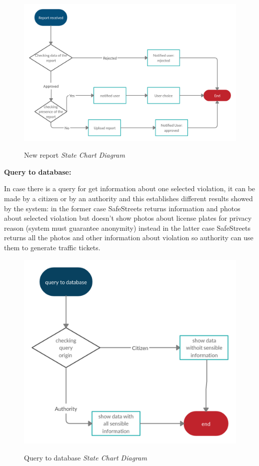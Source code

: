 \documentclass[../RASD.tex]{subfiles}
\begin{document}
    \begin{figure}[H]
        \centering
        \includegraphics[scale = 0.3]{assets/newReportV2.png}\\[1.6 cm]
        \caption[ New report \textit{State Chart Diagram}]{ New report \textit{State Chart Diagram}}
    \end{figure}

    \textbf{Query to database:}

    In case there is a query for get information about one selected violation, it can be made by a citizen or by an authority and this establishes
    different results showed by the system: in the former case SafeStreets returns information and photos about selected violation
    but doesn’t show photos about license plates for privacy reason (system must guarantee anonymity) instead in the latter case
    SafeStreets returns all the photos and other information about violation so authority can use them to generate traffic tickets.

    \begin{figure}[H]
        \centering
        \includegraphics[scale = 0.3]{assets/queryDbV1.png}\\[1.6 cm]
        \caption[ Query to database \textit{State Chart Diagram}]{ Query to database \textit{State Chart Diagram}}
    \end{figure}
\end{document}
